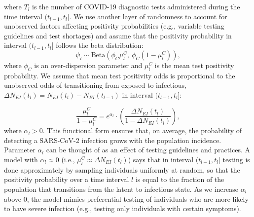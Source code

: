 where $T_l$ is the number of COVID-19 diagnostic tests administered during the time interval $(t_{l-1}, t_l]$.
We use another layer of randomness to account for unobserved factors affecting positivity probabilities (e.g., variable testing guidelines and test shortages) and assume that the positivity probability in interval $(t_{l-1}, t_l]$ follows the beta distribution:
\begin{equation}
\psi_{l}  \sim \text{Beta}\left (\phi_C \mu^C_l,\ \phi_C \left (1 - \mu^C_l \right )\right ),
\label{ch_4:eqn:positivity}
\end{equation}
where $ \phi_C $ is an over-dispersion parameter and $\mu^C_l$ is the mean test positivity probability.
We assume that mean test positivity odds is proportional to the unobserved odds of transitioning from exposed to infectious, $\Delta N_{E I}(t_l) = N_{E I}(t_l) - N_{E I}(t_{l-1})$ in interval $(t_{l-1}, t_l]$:

\begin{equation}
\frac{\mu^C_l}{1- \mu^C_l}= e^{\alpha_l} \cdot \left( \frac{\Delta N_{EI}(t_l)}{1 - \Delta N_{EI}(t_l)}\right),
\label{ch_4:eqn:testlogoddsmean}
\end{equation}
where $\alpha_l > 0$.
This functional form ensures that, on average, the probability of detecting a SARS-CoV-2 infection grows with the population incidence.
Parameter $\alpha_l$ can be thought of as an effect of testing guidelines and practices.
A model with $\alpha_l \approx 0$ (i.e., $\mu^C_l \approx \Delta N_{EI}(t_l)$) says that in interval $(t_{l-1}, t_l]$ testing is done approximately by sampling individuals uniformly at random, so that the positivity probability over a time interval $ l $ is equal to the fraction of the population that transitions from the latent to infectious state.
As we increase $\alpha_l$ above 0, the model mimics preferential testing of individuals who are more likely to have severe infection (e.g., testing only individuals with certain symptoms).

